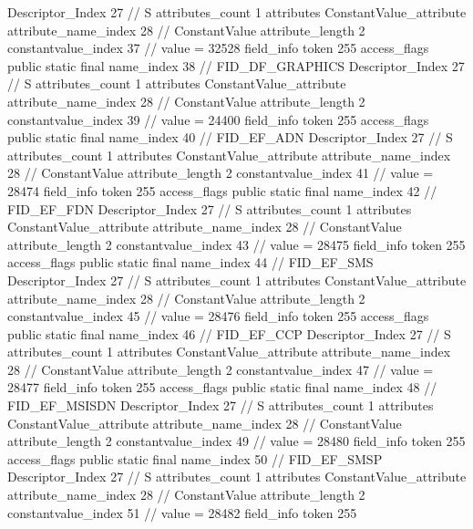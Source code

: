 {{{{{				Descriptor_Index	27		// S
				attributes_count	1
				attributes {
				ConstantValue_attribute {
					attribute_name_index	28		// ConstantValue
					attribute_length	2
					constantvalue_index	37		// value = 32528
				}
				}
			}
			field_info {
				token	255
				access_flags	public static final
				name_index	38		// FID_DF_GRAPHICS
				Descriptor_Index	27		// S
				attributes_count	1
				attributes {
				ConstantValue_attribute {
					attribute_name_index	28		// ConstantValue
					attribute_length	2
					constantvalue_index	39		// value = 24400
				}
				}
			}
			field_info {
				token	255
				access_flags	public static final
				name_index	40		// FID_EF_ADN
				Descriptor_Index	27		// S
				attributes_count	1
				attributes {
				ConstantValue_attribute {
					attribute_name_index	28		// ConstantValue
					attribute_length	2
					constantvalue_index	41		// value = 28474
				}
				}
			}
			field_info {
				token	255
				access_flags	public static final
				name_index	42		// FID_EF_FDN
				Descriptor_Index	27		// S
				attributes_count	1
				attributes {
				ConstantValue_attribute {
					attribute_name_index	28		// ConstantValue
					attribute_length	2
					constantvalue_index	43		// value = 28475
				}
				}
			}
			field_info {
				token	255
				access_flags	public static final
				name_index	44		// FID_EF_SMS
				Descriptor_Index	27		// S
				attributes_count	1
				attributes {
				ConstantValue_attribute {
					attribute_name_index	28		// ConstantValue
					attribute_length	2
					constantvalue_index	45		// value = 28476
				}
				}
			}
			field_info {
				token	255
				access_flags	public static final
				name_index	46		// FID_EF_CCP
				Descriptor_Index	27		// S
				attributes_count	1
				attributes {
				ConstantValue_attribute {
					attribute_name_index	28		// ConstantValue
					attribute_length	2
					constantvalue_index	47		// value = 28477
				}
				}
			}
			field_info {
				token	255
				access_flags	public static final
				name_index	48		// FID_EF_MSISDN
				Descriptor_Index	27		// S
				attributes_count	1
				attributes {
				ConstantValue_attribute {
					attribute_name_index	28		// ConstantValue
					attribute_length	2
					constantvalue_index	49		// value = 28480
				}
				}
			}
			field_info {
				token	255
				access_flags	public static final
				name_index	50		// FID_EF_SMSP
				Descriptor_Index	27		// S
				attributes_count	1
				attributes {
				ConstantValue_attribute {
					attribute_name_index	28		// ConstantValue
					attribute_length	2
					constantvalue_index	51		// value = 28482
				}
				}
			}
			field_info {
				token	255
}}}}}
